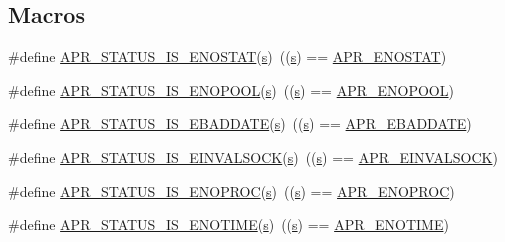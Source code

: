 \subsection*{Macros}
\begin{DoxyCompactItemize}
\item 
\#define \hyperlink{group__APR__STATUS__IS_ga1f0d21900aa879ca4866b1bf846cfd0d}{A\+P\+R\+\_\+\+S\+T\+A\+T\+U\+S\+\_\+\+I\+S\+\_\+\+E\+N\+O\+S\+T\+AT}(\hyperlink{pcretest_8txt_a062597889ba244b72877454b1d3adecf}{s})~((\hyperlink{pcretest_8txt_a062597889ba244b72877454b1d3adecf}{s}) == \hyperlink{group__APR__Error_ga7995805cf68be1fb16f684c544e45fbe}{A\+P\+R\+\_\+\+E\+N\+O\+S\+T\+AT})
\item 
\#define \hyperlink{group__APR__STATUS__IS_ga71f149437af305f0a0cabde2cc3f3b19}{A\+P\+R\+\_\+\+S\+T\+A\+T\+U\+S\+\_\+\+I\+S\+\_\+\+E\+N\+O\+P\+O\+OL}(\hyperlink{pcretest_8txt_a062597889ba244b72877454b1d3adecf}{s})~((\hyperlink{pcretest_8txt_a062597889ba244b72877454b1d3adecf}{s}) == \hyperlink{group__APR__Error_gaa8461873202e5e0b4c0ea261e05b07a9}{A\+P\+R\+\_\+\+E\+N\+O\+P\+O\+OL})
\item 
\#define \hyperlink{group__APR__STATUS__IS_gaf1313bed3538d6d57995bca164ebac20}{A\+P\+R\+\_\+\+S\+T\+A\+T\+U\+S\+\_\+\+I\+S\+\_\+\+E\+B\+A\+D\+D\+A\+TE}(\hyperlink{pcretest_8txt_a062597889ba244b72877454b1d3adecf}{s})~((\hyperlink{pcretest_8txt_a062597889ba244b72877454b1d3adecf}{s}) == \hyperlink{group__APR__Error_ga7911720c540a929cc08a2c25e606b56e}{A\+P\+R\+\_\+\+E\+B\+A\+D\+D\+A\+TE})
\item 
\#define \hyperlink{group__APR__STATUS__IS_ga7fcc752663660de85fa046b2de014b97}{A\+P\+R\+\_\+\+S\+T\+A\+T\+U\+S\+\_\+\+I\+S\+\_\+\+E\+I\+N\+V\+A\+L\+S\+O\+CK}(\hyperlink{pcretest_8txt_a062597889ba244b72877454b1d3adecf}{s})~((\hyperlink{pcretest_8txt_a062597889ba244b72877454b1d3adecf}{s}) == \hyperlink{group__APR__Error_ga548032b79ce0671d9986db0654858812}{A\+P\+R\+\_\+\+E\+I\+N\+V\+A\+L\+S\+O\+CK})
\item 
\#define \hyperlink{group__APR__STATUS__IS_ga566f4c9b9db8a0c31199a938bdc4e38a}{A\+P\+R\+\_\+\+S\+T\+A\+T\+U\+S\+\_\+\+I\+S\+\_\+\+E\+N\+O\+P\+R\+OC}(\hyperlink{pcretest_8txt_a062597889ba244b72877454b1d3adecf}{s})~((\hyperlink{pcretest_8txt_a062597889ba244b72877454b1d3adecf}{s}) == \hyperlink{group__APR__Error_ga18aa6d4ebaefda39478649c20bbeb9df}{A\+P\+R\+\_\+\+E\+N\+O\+P\+R\+OC})
\item 
\#define \hyperlink{group__APR__STATUS__IS_ga65cb54d0b5902784037626841e26e709}{A\+P\+R\+\_\+\+S\+T\+A\+T\+U\+S\+\_\+\+I\+S\+\_\+\+E\+N\+O\+T\+I\+ME}(\hyperlink{pcretest_8txt_a062597889ba244b72877454b1d3adecf}{s})~((\hyperlink{pcretest_8txt_a062597889ba244b72877454b1d3adecf}{s}) == \hyperlink{group__APR__Error_ga7acfb436774a21ae93ff5c1b89e7c4f5}{A\+P\+R\+\_\+\+E\+N\+O\+T\+I\+ME})

\end{DoxyCompactItemize}
